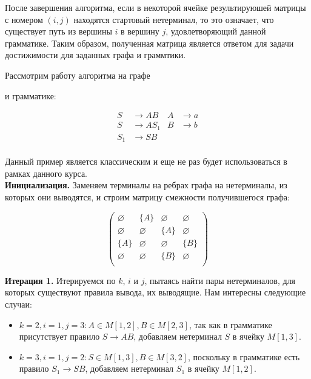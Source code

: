 После завершения алгоритма, если в некоторой ячейке результируюшей матрицы с номером $(i, j)$ находятся стартовый нетерминал, то это означает, что существует путь из вершины $i$ в вершину $j$, удовлетворяющий данной грамматике. Таким образом, полученная матрица является ответом для задачи достижимости для заданных графа и граммтики.

\begin{example}
\label{CYK_algorithm_ex}
Рассмотрим работу алгоритма на графе

\begin{center}
  
\end{center}

и грамматике:

\begin{align*}
S   & \to A B    & A   & \to a     \\
S   & \to A S_1  & B   & \to b\\
S_1 & \to S B   &&\\
\end{align*}

Данный пример является классическим и еще не раз будет использоваться в рамках данного курса. \\

\textbf{Инициализация.}
Заменяем терминалы на ребрах графа на нетерминалы, из которых они выводятся, и строим матрицу смежности получившегося графа:

\begin{center}
  
\end{center}

\[
\begin{pmatrix}
\varnothing & \{A\}       & \varnothing & \varnothing \\
\varnothing & \varnothing & \{A\}       & \varnothing \\
\{A\}       & \varnothing & \varnothing & \{B\}       \\
\varnothing & \varnothing & \{B\}       & \varnothing \\
\end{pmatrix}
\]

\textbf{Итерация 1.}
Итерируемся по $k$, $i$ и $j$, пытаясь найти пары нетерминалов, для которых существуют правила вывода, их выводящие. Нам интересны следующие случаи:

\begin{itemize}
    \item $k = 2, i = 1, j = 3: A \in M[1, 2], B \in M[2, 3]$, так как в грамматике присутствует правило $S \to A B$, добавляем нетерминал $S$ в ячейку $M[1, 3]$.
    \item $k = 3, i = 1, j = 2: S \in M[1, 3], B \in M[3, 2]$, поскольку в грамматике есть правило $S_1 \to S B$, добавляем нетерминал $S_1$ в ячейку $M[1, 2]$.
\end{itemize}


\end{example}
